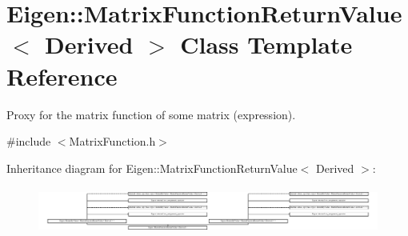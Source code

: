 \hypertarget{class_eigen_1_1_matrix_function_return_value}{}\section{Eigen\+:\+:Matrix\+Function\+Return\+Value$<$ Derived $>$ Class Template Reference}
\label{class_eigen_1_1_matrix_function_return_value}


Proxy for the matrix function of some matrix (expression).  




{\ttfamily \#include $<$Matrix\+Function.\+h$>$}

Inheritance diagram for Eigen\+:\+:Matrix\+Function\+Return\+Value$<$ Derived $>$\+:\begin{figure}[H]
\begin{center}
\leavevmode
\includegraphics[height=1.535649cm]{class_eigen_1_1_matrix_function_return_value}
\end{center}
\end{figure}
